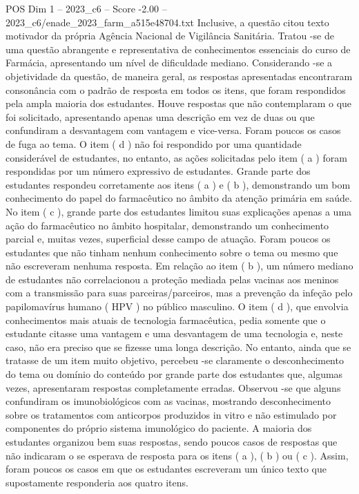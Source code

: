 \begin{textsample}{POS Dim 1 – 2023\_c6 – Score -2.00 – 2023\_c6/enade\_2023\_farm\_a515e48704.txt}
Inclusive, a questão citou texto motivador da própria Agência Nacional de Vigilância Sanitária.
Tratou -se de uma questão abrangente e representativa de conhecimentos essenciais do curso de Farmácia, apresentando um nível de dificuldade mediano.
Considerando -se a objetividade da questão, de maneira geral, as respostas apresentadas encontraram consonância com o padrão de resposta em todos os itens, que foram respondidos pela ampla maioria dos estudantes.
Houve respostas que não contemplaram o que foi solicitado, apresentando apenas uma descrição em vez de duas ou que confundiram a desvantagem com vantagem e vice-versa.
Foram poucos os casos de fuga ao tema.
O item ( d ) não foi respondido por uma quantidade considerável de estudantes, no entanto, as ações solicitadas pelo item ( a ) foram respondidas por um número expressivo de estudantes.
Grande parte dos estudantes respondeu corretamente aos itens ( a ) e ( b ), demonstrando um bom conhecimento do papel do farmacêutico no âmbito da atenção primária em saúde.
No item ( c ), grande parte dos estudantes limitou suas explicações apenas a uma ação do farmacêutico no âmbito hospitalar, demonstrando um conhecimento parcial e, muitas vezes, superficial desse campo de atuação.
Foram poucos os estudantes que não tinham nenhum conhecimento sobre o tema ou mesmo que não escreveram nenhuma resposta.
Em relação ao item ( b ), um número mediano de estudantes não correlacionou a proteção mediada pelas vacinas aos meninos com a transmissão para suas parceiras/parceiros, mas a prevenção da infeção pelo papilomavírus humano ( HPV ) no público masculino.
O item ( d ), que envolvia conhecimentos mais atuais de tecnologia farmacêutica, pedia somente que o estudante citasse uma vantagem e uma desvantagem de uma tecnologia e, neste caso, não era preciso que se fizesse uma longa descrição.
No entanto, ainda que se tratasse de um item muito objetivo, percebeu -se claramente o desconhecimento do tema ou domínio do conteúdo por grande parte dos estudantes que, algumas vezes, apresentaram respostas completamente erradas.
Observou -se que alguns confundiram os imunobiológicos com as vacinas, mostrando desconhecimento sobre os tratamentos com anticorpos produzidos in vitro e não estimulado por componentes do próprio sistema imunológico do paciente.
A maioria dos estudantes organizou bem suas respostas, sendo poucos casos de respostas que não indicaram o se esperava de resposta para os itens ( a ), ( b ) ou ( c ).
Assim, foram poucos os casos em que os estudantes escreveram um único texto que supostamente responderia aos quatro itens.

\end{textsample}
